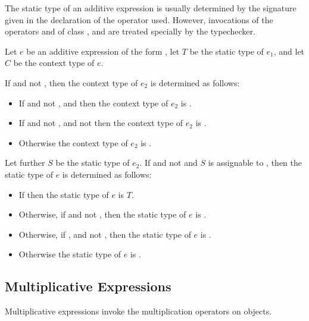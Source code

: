 \documentclass[makeidx]{article}
\begin{document}
{\LMHash{}%
The static type of an additive expression is usually determined
by the signature given in the declaration of the operator used.
However, invocations of the operators \code{+} and \code{-} of
class ,  and 
are treated specially by the typechecker.

\LMHash{}%
Let $e$ be an additive expression of the form ,
let $T$ be the static type of $e_1$,
and let $C$ be the context type of $e$.

If  and not , then
the context type of $e_2$ is determined as follows:
\begin{itemize}
  \item{} If  and not ,
      and 
      then the context type of $e_2$ is .
  \item{} If  and not ,
      and not 
     then the context type of $e_2$ is .
  \item{} Otherwise the context type of $e_2$ is .
\end{itemize}
Let further $S$ be the static type of $e_2$.
If  and not 
and $S$ is assignable to ,
then the static type of $e$ is determined as follows:
\begin{itemize}
  \item{} If 
    then the static type of $e$ is $T$.
  \item{} Otherwise, if 
    and not ,
    then the static type of $e$ is .
  \item{} Otherwise, if ,
     and not ,
    then the static type of $e$ is .
  \item{} Otherwise the static type of $e$ is .
\end{itemize}

\subsection{Multiplicative Expressions}

\LMHash{}%
Multiplicative expressions invoke the multiplication operators on objects.

}
\end{document}
